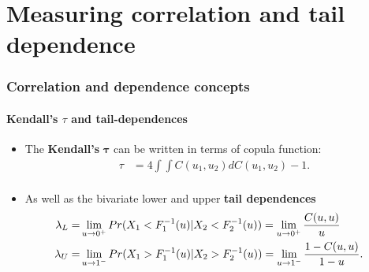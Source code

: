 \documentclass[14pt]{beamer}
\begin{document}
\section{Measuring correlation and tail dependence}
\begin{frame}
  \frametitle{Correlation and dependence concepts}
  \framesubtitle{Kendall's $\tau$ and tail-dependences}
  \begin{itemize}
  \item The \textbf{Kendall's} $\bm{\tau}$ can be written in terms of copula function:
    \begin{equation*}
      \begin{split}
        \tau  & = 4 \int \int C(u_1, u_2)dC(u_1,u_2)-1. \\
      \end{split}
    \end{equation*}

  \item As well as the bivariate lower and upper \textbf{tail dependences}
    \begin{equation*}
      \begin{split}
      \hspace{-1em}  \lambda_L = & \lim \limits_{u \to 0^{+}} Pr(X_1< F_1^{-1}(u)| X_2<F_2^{-1}(u))= \lim \limits_{u \to 0^{+}} \frac{C(u,u)}{u}\\
      \hspace{-1em}  \lambda_U=&\lim \limits_{u \to 1^{-}} Pr(X_1> F_1^{-1}(u)|
        X_2>F_2^{-1}(u))= \lim \limits_{u \to 1^{-}} \frac{1-C(u,u)}{1-u}.\\
      \end{split}
    \end{equation*}

  \end{itemize}
\end{frame}
\end{document}
